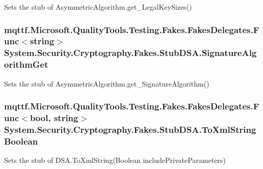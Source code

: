 Sets the stub of Asymmetric\-Algorithm.\-get\-\_\-\-Legal\-Key\-Sizes()

\hypertarget{class_system_1_1_security_1_1_cryptography_1_1_fakes_1_1_stub_d_s_a_a43a528c6ab7bff7d65a1d71c4a8f0250}{
\subsubsection[{Signature\-Algorithm\-Get}]{\setlength{\rightskip}{0pt plus 5cm}mqttf.\-Microsoft.\-Quality\-Tools.\-Testing.\-Fakes.\-Fakes\-Delegates.\-Func$<$string$>$ System.\-Security.\-Cryptography.\-Fakes.\-Stub\-D\-S\-A.\-Signature\-Algorithm\-Get}}\label{class_system_1_1_security_1_1_cryptography_1_1_fakes_1_1_stub_d_s_a_a43a528c6ab7bff7d65a1d71c4a8f0250}


Sets the stub of Asymmetric\-Algorithm.\-get\-\_\-\-Signature\-Algorithm()

\hypertarget{class_system_1_1_security_1_1_cryptography_1_1_fakes_1_1_stub_d_s_a_a49718865b58e9938147904fe2f167ca7}{
\subsubsection[{To\-Xml\-String\-Boolean}]{\setlength{\rightskip}{0pt plus 5cm}mqttf.\-Microsoft.\-Quality\-Tools.\-Testing.\-Fakes.\-Fakes\-Delegates.\-Func$<$bool, string$>$ System.\-Security.\-Cryptography.\-Fakes.\-Stub\-D\-S\-A.\-To\-Xml\-String\-Boolean}}\label{class_system_1_1_security_1_1_cryptography_1_1_fakes_1_1_stub_d_s_a_a49718865b58e9938147904fe2f167ca7}


Sets the stub of D\-S\-A.\-To\-Xml\-String(\-Boolean include\-Private\-Parameters)

